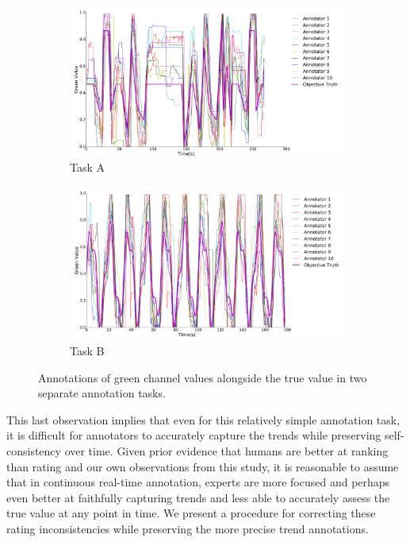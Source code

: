 \documentclass[times,twocolumn,final,authoryear]{elsarticle}
\begin{document}
\begin{figure}[t]
	\centering
	\begin{subfigure}{0.49\textwidth}
	\includegraphics[width=\columnwidth]{images/annotations_ot}
	\caption{\footnotesize Task A \hspace*{1.2cm}}
	\label{fig:annotations_ot_a}
	\end{subfigure}
	\begin{subfigure}{0.49\textwidth}
	\includegraphics[width=\columnwidth]{images/annotations_ot2}
	\caption{\footnotesize Task B \hspace*{1cm}}
	\label{fig:annotations_ot_b}
	\end{subfigure}
	\caption{Annotations of green channel values alongside the true value in two separate annotation tasks.}
	\label{fig:annotations_ot}
\end{figure}

This last observation implies that even for this relatively simple annotation task, it is difficult for annotators to accurately capture the trends while preserving self-consistency over time.  Given prior evidence that humans are better at ranking than rating \citep{Yannakakis2011, metallinou2013annotation, yannakakis2015ratings} and our own observations from this study, it is reasonable to assume that in continuous real-time annotation, experts are more focused and perhaps even better at faithfully capturing trends and less able to accurately assess the true value at any point in time.  We present a procedure for correcting these rating inconsistencies while preserving the more precise trend annotations.
\end{document}
